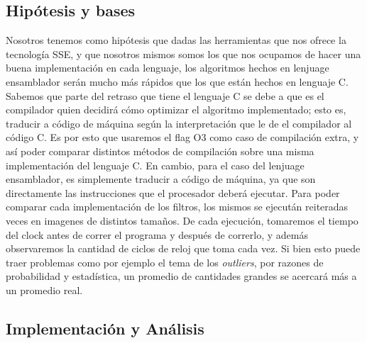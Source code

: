 \documentclass[a4paper]{article}
\begin{document}
\subsection{Hipótesis y bases}
Nosotros tenemos como hipótesis que dadas las herramientas que nos ofrece la tecnología SSE, y que nosotros mismos somos los que nos
ocupamos de hacer una buena implementación en cada lenguaje, los algoritmos hechos en lenjuage ensamblador serán mucho más rápidos
que los que están hechos en lenguaje C. Sabemos que parte del retraso que tiene el lenguaje C se debe a que es el compilador quien decidirá cómo
optimizar el algoritmo implementado; esto es, traducir a código de máquina según la interpretación que le de el compilador al código C. Es por esto 
que usaremos el flag O3 como caso de compilación extra, y así poder comparar distintos métodos de compilación sobre una misma 
implementación del lenguaje C.
En cambio, para el caso del lenjuage ensamblador, es simplemente traducir a código de máquina, ya que son directamente las instrucciones
que el procesador deberá ejecutar.
\newline
Para poder comparar cada implementación de los filtros, los mismos se ejecután reiteradas veces en imagenes de distintos tamaños.
De cada ejecución, tomaremos el tiempo del clock antes de correr el programa y después de correrlo, y además observaremos
la cantidad de ciclos de reloj que toma cada vez. Si bien esto puede traer problemas como por ejemplo el tema de los \textit{outliers},
por razones de probabilidad y estadística, un promedio de cantidades grandes se acercará más a un promedio real.

\subsection{Implementación y Análisis}
\end{document}

